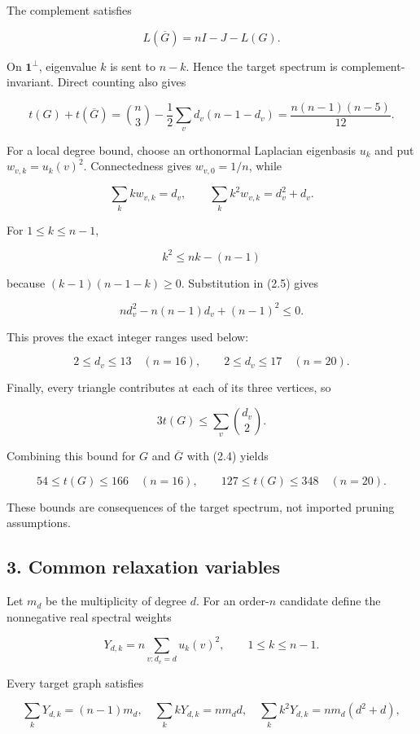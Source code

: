 \documentclass[
  english,
  11pt,
  a4paper,
]{article}
\begin{document}
The complement satisfies

\[
L(\overline G)=nI-J-L(G).
\]

On \(\mathbf1^\perp\), eigenvalue \(k\) is sent to \(n-k\). Hence the
target spectrum is complement-invariant. Direct counting also gives

\[
t(G)+t(\overline G)
=\binom n3-\frac12\sum_vd_v(n-1-d_v)
=\frac{n(n-1)(n-5)}{12}.
\tag{2.4}
\]

For a local degree bound, choose an orthonormal Laplacian eigenbasis
\(u_k\) and put \(w_{v,k}=u_k(v)^2\). Connectedness gives
\(w_{v,0}=1/n\), while

\[
\sum_kkw_{v,k}=d_v,
\qquad
\sum_kk^2w_{v,k}=d_v^2+d_v.
\tag{2.5}
\]

For \(1\le k\le n-1\),

\[
k^2\le nk-(n-1)
\]

because \((k-1)(n-1-k)\ge0\). Substitution in (2.5) gives

\[
nd_v^2-n(n-1)d_v+(n-1)^2\le0.
\tag{2.6}
\]

This proves the exact integer ranges used below:

\[
2\le d_v\le13\quad(n=16),
\qquad
2\le d_v\le17\quad(n=20).
\tag{2.7}
\]

Finally, every triangle contributes at each of its three vertices, so

\[
3t(G)\le\sum_v\binom{d_v}{2}.
\]

Combining this bound for \(G\) and \(\overline G\) with (2.4) yields

\[
54\le t(G)\le166\quad(n=16),
\qquad
127\le t(G)\le348\quad(n=20).
\tag{2.8}
\]

These bounds are consequences of the target spectrum, not imported
pruning assumptions.

\subsection{3. Common relaxation
variables}\label{common-relaxation-variables}

Let \(m_d\) be the multiplicity of degree \(d\). For an order-\(n\)
candidate define the nonnegative real spectral weights

\[
Y_{d,k}=n\sum_{v:d_v=d}u_k(v)^2,
\qquad 1\le k\le n-1.
\tag{3.1}
\]

Every target graph satisfies

\[
\sum_kY_{d,k}=(n-1)m_d,
\quad
\sum_kkY_{d,k}=nm_dd,
\quad
\sum_kk^2Y_{d,k}=nm_d(d^2+d),
\tag{3.2}
\]
\end{document}
